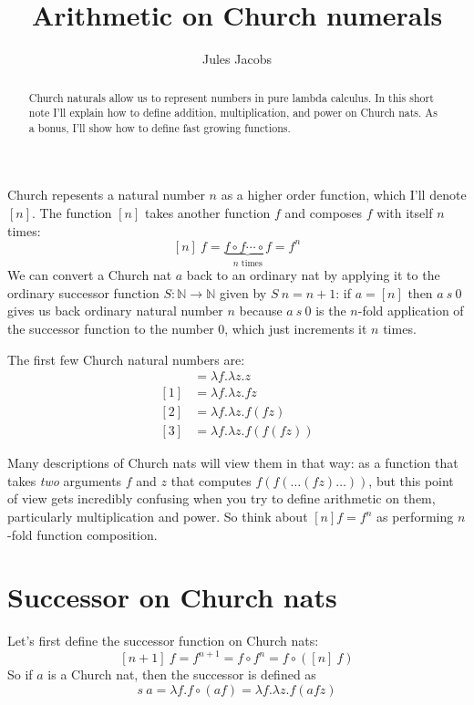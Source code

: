 \documentclass[a4paper, 11pt]{article}
\title{Arithmetic on Church numerals}
\author{Jules Jacobs}
\newcommand{\N}{\mathbb{N}}
\theoremstyle{definition}
\begin{document}
\maketitle

\begin{abstract}
  Church naturals allow us to represent numbers in pure lambda calculus. In this short note I'll explain how to define addition, multiplication, and power on Church nats. As a bonus, I'll show how to define fast growing functions.
\end{abstract}

Church repesents a natural number $n$ as a higher order function, which I'll denote $[n]$. The function $[n]$ takes another function $f$ and composes $f$ with itself $n$ times:
\[
  [n]\ f = \underbrace{f \circ f \cdots \circ f}_{n\text{ times}} = f^n
\]
We can convert a Church nat $a$ back to an ordinary nat by applying it to the ordinary successor function $S : \N \to \N$ given by $S\ n = n+1$: if $a = [n]$ then $a\ s\ 0$ gives us back ordinary natural number $n$ because $a\ s\ 0$ is the $n$-fold application of the successor function to the number $0$, which just increments it $n$ times.

The first few Church natural numbers are:
\begin{align*}
  [0] &= \lambda f.\lambda z. z\\
  [1] &= \lambda f.\lambda z. f z\\
  [2] &= \lambda f.\lambda z.f (f z)\\
  [3] &= \lambda f.\lambda z.f (f (f z))
\end{align*}

Many descriptions of Church nats will view them in that way: as a function that takes \emph{two} arguments $f$ and $z$ that computes $f (f (\dots (f z) \dots))$, but this point of view gets incredibly confusing when you try to define arithmetic on them, particularly multiplication and power. So think about $[n] f = f^n$ as performing $n$-fold function composition.

\section*{Successor on Church nats}

Let's first define the successor function on Church nats:
\[
  [n + 1]\ f = f^{n+1} = f \circ f^n = f \circ ([n]\ f)
\]
So if $a$ is a Church nat, then the successor is defined as
\[
  s\ a = \lambda f. f \circ (a f) = \lambda f. \lambda z. f (a f z)
\]
\end{document}
